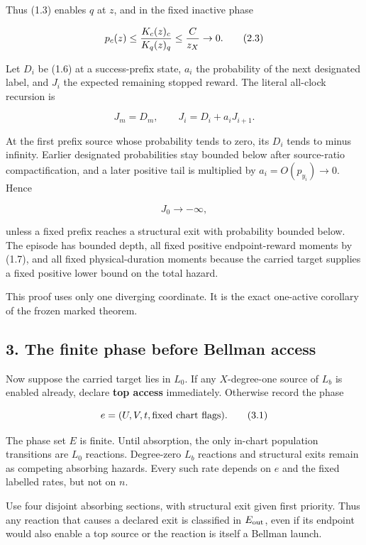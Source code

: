 Thus (1.3) enables \(q\) at \(z\), and in the fixed inactive phase

\[
                    p_c(z)\le {K_c(z)_c\over K_q(z)_q}
                              \le {C\over z_X}\to0.     \tag{2.3}
\]

Let \(D_i\) be (1.6) at a success-prefix state, \(a_i\) the probability
of the next designated label, and \(J_i\) the expected remaining stopped
reward. The literal all-clock recursion is

\[
                         J_m=D_m,\qquad J_i=D_i+a_iJ_{i+1}. \tag{2.4}
\]

At the first prefix source whose probability tends to zero, its \(D_i\)
tends to minus infinity. Earlier designated probabilities stay bounded
below after source-ratio compactification, and a later positive tail is
multiplied by \(a_i=O(p_{y_i})\to0\). Hence

\[
                              J_0\longrightarrow-\infty, \tag{2.5}
\]

unless a fixed prefix reaches a structural exit with probability bounded
below. The episode has bounded depth, all fixed positive endpoint-reward
moments by (1.7), and all fixed physical-duration moments because the
carried target supplies a fixed positive lower bound on the total
hazard.

This proof uses only one diverging coordinate. It is the exact
one-active corollary of the frozen marked theorem.

\subsection{3. The finite phase before Bellman
access}

Now suppose the carried target lies in \(L_0\). If any \(X\)-degree-one
source of \(L_b\) is enabled already, declare \textbf{top access}
immediately. Otherwise record the phase

\[
                     e=(U,V,t,\hbox{fixed chart flags}). \tag{3.1}
\]

The phase set \(E\) is finite. Until absorption, the only in-chart
population transitions are \(L_0\) reactions. Degree-zero \(L_b\)
reactions and structural exits remain as competing absorbing hazards.
Every such rate depends on \(e\) and the fixed labelled rates, but not
on \(n\).

Use four disjoint absorbing sections, with structural exit given first
priority. Thus any reaction that causes a declared exit is classified in
\(E_{\rm out}\), even if its endpoint would also enable a top source or
the reaction is itself a Bellman launch.

